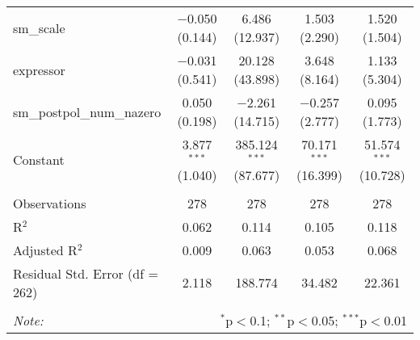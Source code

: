 \begin{table}[H]
{\begin{tabular}{@{\extracolsep{5pt}}lcccc}
  sm\_scale & $-$0.050 (0.144) & 6.486 (12.937) & 1.503 (2.290) & 1.520 (1.504) \\ 
  expressor & $-$0.031 (0.541) & 20.128 (43.898) & 3.648 (8.164) & 1.133 (5.304) \\ 
  sm\_postpol\_num\_nazero & 0.050 (0.198) & $-$2.261 (14.715) & $-$0.257 (2.777) & 0.095 (1.773) \\ 
  Constant & 3.877$^{***}$ (1.040) & 385.124$^{***}$ (87.677) & 70.171$^{***}$ (16.399) & 51.574$^{***}$ (10.728) \\ 
 \hline \\[-1.8ex] 
Observations & 278 & 278 & 278 & 278 \\ 
R$^{2}$ & 0.062 & 0.114 & 0.105 & 0.118 \\ 
Adjusted R$^{2}$ & 0.009 & 0.063 & 0.053 & 0.068 \\ 
Residual Std. Error (df = 262) & 2.118 & 188.774 & 34.482 & 22.361 \\ 
\hline 
\hline \\[-1.8ex] 
\textit{Note:}  & \multicolumn{4}{r}{$^{*}$p$<$0.1; $^{**}$p$<$0.05; $^{***}$p$<$0.01} \\ 
\end{tabular} 
}
\end{table} 
